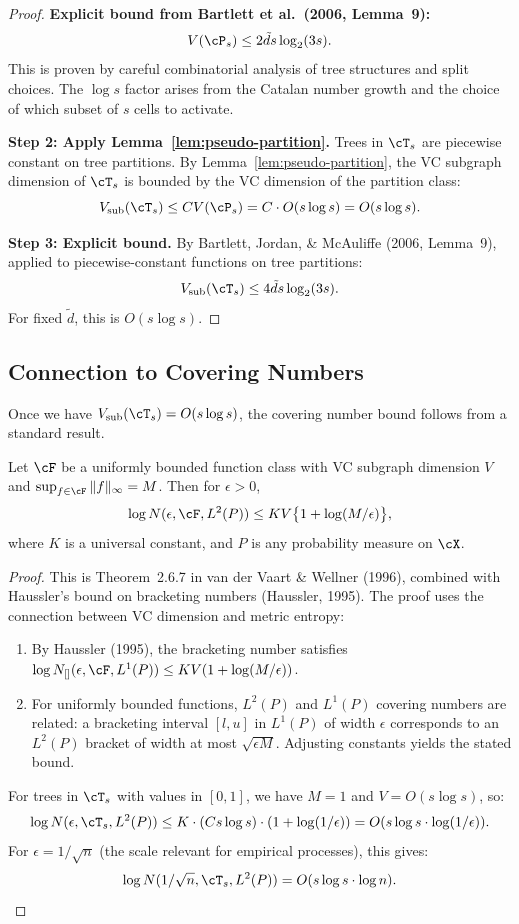 \documentclass[12pt]{article}
\begin{document}
\begin{proof}
\textbf{Explicit bound from Bartlett et al.\ (2006, Lemma~9):}
\[
V(\cP_s) \le 2\tilde{d} s \log_2(3s).
\]
This is proven by careful combinatorial analysis of tree structures and split choices. The $\log s$ factor arises from the Catalan number growth and the choice of which subset of $s$ cells to activate.

\noindent\textbf{Step 2: Apply Lemma~\ref{lem:pseudo-partition}.}
Trees in $\cT_s$ are piecewise constant on tree partitions. By Lemma~\ref{lem:pseudo-partition}, the VC subgraph dimension of $\cT_s$ is bounded by the VC dimension of the partition class:
\[
V_{\text{sub}}(\cT_s) \le C V(\cP_s) = C \cdot O(s \log s) = O(s \log s).
\]

\noindent\textbf{Step 3: Explicit bound.}
By Bartlett, Jordan, \& McAuliffe (2006, Lemma~9), applied to piecewise-constant functions on tree partitions:
\[
V_{\text{sub}}(\cT_s) \le 4\tilde{d} s \log_2(3s).
\]
For fixed $\tilde{d}$, this is $O(s \log s)$.
\end{proof}

\subsection{Connection to Covering Numbers}

Once we have $V_{\text{sub}}(\cT_s) = O(s \log s)$, the covering number bound follows from a standard result.

\begin{corollary}
\label{cor:covering-app}
Let $\cF$ be a uniformly bounded function class with VC subgraph dimension $V$ and $\sup_{f \in \cF} \|f\|_\infty = M$. Then for $\epsilon > 0$,
\[
\log N(\epsilon, \cF, L^2(P)) \le K V \bigl\{ 1 + \log(M/\epsilon) \bigr\},
\]
where $K$ is a universal constant, and $P$ is any probability measure on $\cX$.
\end{corollary}

\begin{proof}
This is Theorem~2.6.7 in van der Vaart \& Wellner (1996), combined with Haussler's bound on bracketing numbers (Haussler, 1995). The proof uses the connection between VC dimension and metric entropy:
\begin{enumerate}
\item By Haussler (1995), the bracketing number satisfies $\log N_{[]}(\epsilon, \cF, L^1(P)) \le K V (1 + \log(M/\epsilon))$.
\item For uniformly bounded functions, $L^2(P)$ and $L^1(P)$ covering numbers are related: a bracketing interval $[l, u]$ in $L^1(P)$ of width $\epsilon$ corresponds to an $L^2(P)$ bracket of width at most $\sqrt{\epsilon M}$. Adjusting constants yields the stated bound.
\end{enumerate}

For trees in $\cT_s$ with values in $[0,1]$, we have $M = 1$ and $V = O(s \log s)$, so:
\[
\log N(\epsilon, \cT_s, L^2(P)) \le K \cdot (Cs \log s) \cdot (1 + \log(1/\epsilon)) = O(s \log s \cdot \log(1/\epsilon)).
\]
For $\epsilon = 1/\sqrt{n}$ (the scale relevant for empirical processes), this gives:
\[
\log N(1/\sqrt{n}, \cT_s, L^2(P)) = O(s \log s \cdot \log n).
\]
\end{proof}
\end{document}
